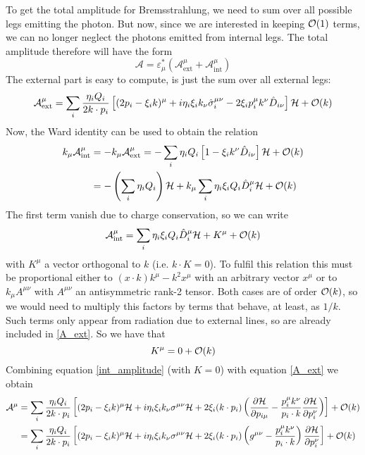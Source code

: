 \documentclass{article}
\begin{document}
To get the total amplitude for Bremsstrahlung,
we need to sum over all possible legs emitting the photon.
But now, since we are interested in keeping $\order{1}$ terms,
we can no longer neglect the photons emitted from internal legs.
The total amplitude therefore will have the form
\begin{equation}
	\mathcal{A}
	= \varepsilon^*_\mu (\mathcal{A}^\mu_{\mathrm{ext}}
	+ \mathcal{A}^\mu_{\mathrm{int}})
\end{equation}
The external part is easy to compute, is just the sum over all external legs:
\begin{equation}\label{A_ext}
	\mathcal{A}^\mu_{\mathrm{ext}}
	= \sum_i\frac{\eta_i Q_i}{2k\cdot p_i}
	\left[
		(2p_i - \xi_i k)^\mu
		+ i\eta_i\xi_i k_\nu \hat{\sigma}_i^{\mu\nu}
		- 2\xi_i p_i^\mu k^\nu \hat{D}_{i\nu}
	\right] \mathcal{H}
	+ \order{k}
\end{equation}
Now, the Ward identity can be used to obtain the relation
\begin{align*}
	k_\mu \mathcal{A}^\mu_{\mathrm{int}} &
	= -k_\mu \mathcal{A}^\mu_{\mathrm{ext}}
	= -\sum_i \eta_i Q_i
	\left[1 - \xi_i k^\nu \hat{D}_{i\nu}\right] \mathcal{H}
	+\order{k}\\&
	= -\left(\sum_i \eta_i Q_i\right)\mathcal{H}
	+ k_\mu \sum_i \eta_i \xi_i Q_i \hat{D}^\mu_{i}\mathcal{H}
	+ \order{k}
\end{align*}
The first term vanish due to charge conservation, so we can write
\begin{equation}\label{int_amplitude}
	\mathcal{A}^\mu_{\mathrm{int}}
	= \sum_i \eta_i \xi_i Q_i \hat{D}^\mu_{i}\mathcal{H} + K^\mu
	+ \order{k}
\end{equation}
with $K^\mu$ a vector orthogonal to $k$ (i.e. $k \cdot K=0$).
To fulfil this relation this must be proportional either to
$(x\cdot k) k^\mu - k^2 x^\mu$ with an arbitrary vector
$x^\mu$ or to $k_\mu A^{\mu\nu}$ with $A^{\mu\nu}$ an antisymmetric rank-2 tensor.
Both cases are of order $\order{k}$,
so we would need to multiply this factors by terms that behave,
at least, as $1/k$. Such terms only appear from radiation due to external lines,
so are already included in \eqref{A_ext}. So we have that
\begin{equation*}
	K^\mu
	= 0 + \order{k}
\end{equation*}
Combining equation \eqref{int_amplitude} (with $K=0$)
with equation \eqref{A_ext} we obtain
\begin{align*}
	\mathcal{A}^\mu &
	= \sum_i \frac{\eta_i Q_i}{2k \cdot p_i}
	\left[
		(2p_i - \xi_i k)^\mu \mathcal{H}
		+ i\eta_i \xi_i k_\nu \sigma^{\mu\nu}\mathcal{H}
		+ 2\xi_i (k \cdot p_i)
		\left(
			\pdv{\mathcal{H}}{p_{i\mu}}
			- \frac{p_i^\mu k^\nu}{p_i \cdot k} \pdv{\mathcal{H}}{p_i^\nu}
		\right)
	\right]
	+ \order{k}\\&
	= \sum_i \frac{\eta_i Q_i}{2k \cdot p_i}
	\left[
		(2p_i - \xi_i k)^\mu \mathcal{H}
		+ i\eta_i \xi_i k_\nu \sigma^{\mu\nu}\mathcal{H}
		+ 2\xi_i (k \cdot p_i)
		\left(g^{\mu\nu} - \frac{p_i^\mu k^\nu}{p_i \cdot k}\right)
		\pdv{\mathcal{H}}{p_{i}^\nu}
	\right]
	+ \order{k}
\end{align*}
\end{document}

